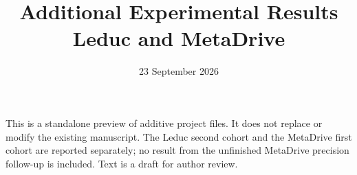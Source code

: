 \documentclass[11pt]{article}
\title{Additional Experimental Results\\Leduc and MetaDrive}
\author{}
\date{23 September 2026}
\begin{document}
\maketitle
\noindent This is a standalone preview of additive project files. It does not
replace or modify the existing manuscript. The Leduc second cohort and the
MetaDrive first cohort are reported separately; no result from the unfinished
MetaDrive precision follow-up is included. Text is a draft for author review.
\tableofcontents
\clearpage

\FloatBarrier
\clearpage

\FloatBarrier
\end{document}
